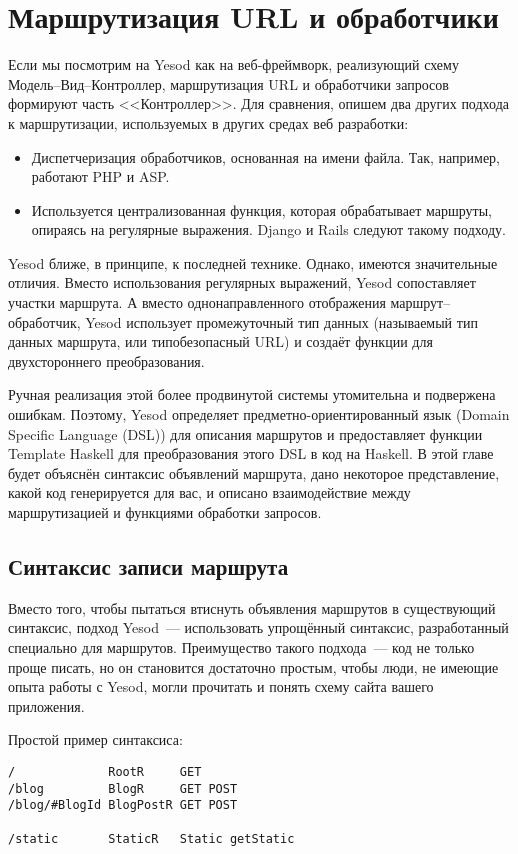 \chapter{Маршрутизация URL и обработчики}\label{ch:routing}
Если мы посмотрим на Yesod как на веб-фреймворк, реализующий схему
Модель--Вид--Контроллер, маршрутизация URL и обработчики запросов
формируют часть <<Контроллер>>. Для сравнения, опишем два других
подхода к маршрутизации, используемых в других средах веб разработки:
\begin{itemize}
\item Диспетчеризация обработчиков, основанная на имени файла. Так,
  например, работают PHP и ASP.

\item Используется централизованная функция, которая обрабатывает
  маршруты, опираясь на регулярные выражения. Django и Rails
  следуют такому подходу.
\end{itemize}

Yesod ближе, в принципе, к последней технике. Однако, имеются
значительные отличия. Вместо использования регулярных выражений, Yesod
сопоставляет участки маршрута. А вместо однонаправленного отображения
маршрут--обработчик, Yesod использует промежуточный тип данных
(называемый тип данных маршрута, или типобезопасный URL) и создаёт
функции для двухстороннего преобразования.

Ручная реализация этой более продвинутой системы утомительна и
подвержена ошибкам. Поэтому, Yesod определяет предметно-ориентированный
язык (Domain Specific Language (DSL)) для описания маршрутов и
предоставляет функции Template Haskell для преобразования этого DSL в
код на Haskell. В этой главе будет объяснён синтаксис объявлений
маршрута, дано некоторое представление, какой код генерируется для
вас, и описано взаимодействие между маршрутизацией и функциями
обработки запросов.

\section{Синтаксис записи маршрута}
Вместо того, чтобы пытаться втиснуть объявления маршрутов в
существующий синтаксис, подход Yesod~--- использовать упрощённый
синтаксис, разработанный специально для маршрутов. Преимущество такого
подхода~--- код не только проще писать, но он становится достаточно
простым, чтобы люди, не имеющие опыта работы с Yesod, могли прочитать и понять
схему сайта вашего приложения.

Простой пример синтаксиса:
\begin{verbatim}
/             RootR     GET
/blog         BlogR     GET POST
/blog/#BlogId BlogPostR GET POST

/static       StaticR   Static getStatic
\end{verbatim}


